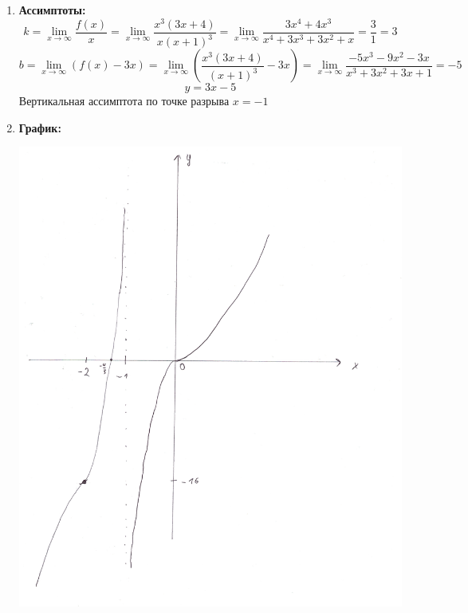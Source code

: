 \documentclass[a4paper,12pt]{article}
\begin{document}
\begin{enumerate}
\begin{center}
\end{center}
\item \textbf{Ассимптоты:}
\[
k = \lim_{x \rightarrow \infty} \frac{f(x)}{x} = \lim_{x \rightarrow \infty} \frac{x^3(3x+4)}{x(x+1)^3} = \lim_{x \rightarrow \infty} \frac{3x^4 + 4x^3}{x^4 + 3x^3 + 3x^2 + x} = \frac{3}{1} = 3
\]
\[
b = \lim_{x \rightarrow \infty}( f(x) - 3x) =\lim_{x \rightarrow \infty} (\frac{x^3(3x+4)}{(x+1)^3} -3x) = \lim_{x \rightarrow \infty} \frac{-5x^3 - 9x^2 -3x}{x^3 + 3x^2 +3x + 1 } = -5
\]
\[
y = 3x - 5
\]
Вертикальная ассимптота по точке разрыва $x = -1$
\item \textbf{График:}
\begin{center}
\includegraphics[scale=0.7]{grah2.png}
\end{center}
\end{enumerate}
\newpage
\end{document}
